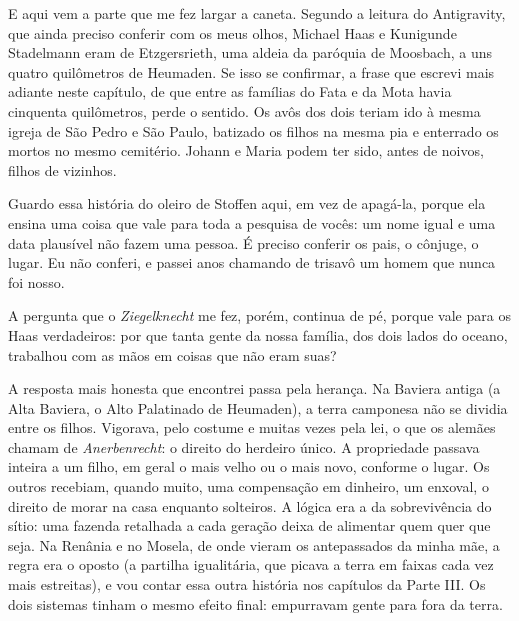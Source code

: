 \documentclass[
  brazilian,
  11pt,
  openany]{book}
\begin{document}
E aqui vem a parte que me fez largar a caneta. Segundo a leitura do
Antigravity, que ainda preciso conferir com os meus olhos, Michael Haas
e Kunigunde Stadelmann eram de Etzgersrieth, uma aldeia da paróquia de
Moosbach, a uns quatro quilômetros de Heumaden. Se isso se confirmar, a
frase que escrevi mais adiante neste capítulo, de que entre as famílias
do Fata e da Mota havia cinquenta quilômetros, perde o sentido. Os avôs
dos dois teriam ido à mesma igreja de São Pedro e São Paulo, batizado os
filhos na mesma pia e enterrado os mortos no mesmo cemitério. Johann e
Maria podem ter sido, antes de noivos, filhos de vizinhos.

Guardo essa história do oleiro de Stoffen aqui, em vez de apagá-la,
porque ela ensina uma coisa que vale para toda a pesquisa de vocês: um
nome igual e uma data plausível não fazem uma pessoa. É preciso conferir
os pais, o cônjuge, o lugar. Eu não conferi, e passei anos chamando de
trisavô um homem que nunca foi nosso.

A pergunta que o \emph{Ziegelknecht} me fez, porém, continua de pé,
porque vale para os Haas verdadeiros: por que tanta gente da nossa
família, dos dois lados do oceano, trabalhou com as mãos em coisas que
não eram suas?

A resposta mais honesta que encontrei passa pela herança. Na Baviera
antiga (a Alta Baviera, o Alto Palatinado de Heumaden), a terra
camponesa não se dividia entre os filhos. Vigorava, pelo costume e
muitas vezes pela lei, o que os alemães chamam de \emph{Anerbenrecht}: o
direito do herdeiro único. A propriedade passava inteira a um filho, em
geral o mais velho ou o mais novo, conforme o lugar. Os outros recebiam,
quando muito, uma compensação em dinheiro, um enxoval, o direito de
morar na casa enquanto solteiros. A lógica era a da sobrevivência do
sítio: uma fazenda retalhada a cada geração deixa de alimentar quem quer
que seja. Na Renânia e no Mosela, de onde vieram os antepassados da
minha mãe, a regra era o oposto (a partilha igualitária, que picava a
terra em faixas cada vez mais estreitas), e vou contar essa outra
história nos capítulos da Parte III. Os dois sistemas tinham o mesmo
efeito final: empurravam gente para fora da terra.
\end{document}
